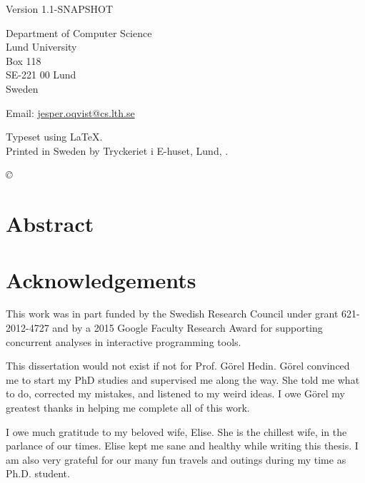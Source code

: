 \documentclass[10pt, twoside, openright]{book}
\begin{document}
\begin{titlepage}
\newpage
\thispagestyle{empty}
\begin{flushleft}
Version 1.1-SNAPSHOT\linebreak[2]

Department of Computer Science\\
Lund University\\
Box 118\\
SE-221 00  Lund\\
Sweden\linebreak[2]

Email: \url{jesper.oqvist@cs.lth.se} \linebreak[2]

Typeset using \LaTeX.\\

Printed in Sweden by Tryckeriet i E-huset, Lund, \thedate.\linebreak[2]

\textit{\copyright ~\thedate~\theauthor}
\vspace{10mm}
\end{flushleft}
\end{titlepage}

\newpage
\section*{Abstract}


\newpage
\section*{Acknowledgements}

This work was in part funded by the Swedish Research Council under grant 621-2012-4727
and by a 2015 Google Faculty Research Award for supporting concurrent analyses in interactive
programming tools.

This dissertation would not exist if not for Prof. Görel Hedin.
Görel convinced me to start my PhD studies and supervised me along the way.
She told me what to do, corrected my mistakes, and listened to my weird ideas.
I owe Görel my greatest thanks in helping me complete all of this work.

I owe much gratitude to my beloved wife, Elise.  She is the chillest wife, in
the parlance of our times.  Elise kept me sane and healthy while writing this
thesis.  I am also very grateful for our many fun travels and outings during my
time as Ph.D. student.
\end{document}

